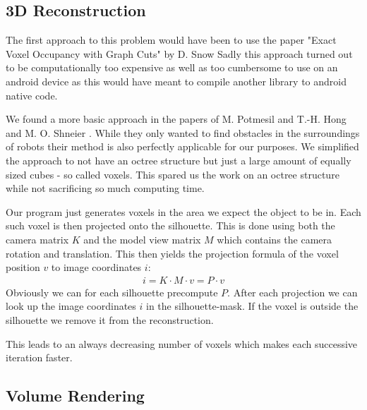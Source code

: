 \documentclass[10pt,twocolumn,letterpaper]{article}
\begin{document}
\subsection{3D Reconstruction}

The first approach to this problem would have been to use the paper "Exact Voxel Occupancy with Graph Cuts" by D. Snow \etal \cite{Snow} Sadly this approach turned out to be computationally too expensive as well as too cumbersome to use on an android device as this would have meant to compile another library to android native code.

We found a more basic approach in the papers of M. Potmesil \cite{Potmesil} and T.-H. Hong and M. O. Shneier \cite{Hong}. While they only wanted to find obstacles in the surroundings of robots their method is also perfectly applicable for our purposes. We simplified the approach to not have an octree structure but just a large amount of equally sized cubes - so called voxels. This spared us the work on an octree structure while not sacrificing so much computing time.

Our program just generates voxels in the area we expect the object to be in. Each such voxel is then projected onto the silhouette. This is done using both the camera matrix $K$ and the model view matrix $M$ which contains the camera rotation and translation. This then yields the projection formula of the voxel position $v$ to image coordinates $i$:
\begin{align}
	i = K \cdot M \cdot v = P \cdot v
\end{align}
Obviously we can for each silhouette precompute $P$. After each projection we can look up the image coordinates $i$ in the silhouette-mask. If the voxel is outside the silhouette we remove it from the reconstruction.

This leads to an always decreasing number of voxels which makes each successive iteration faster.

\subsection{Volume Rendering}
\end{document}
